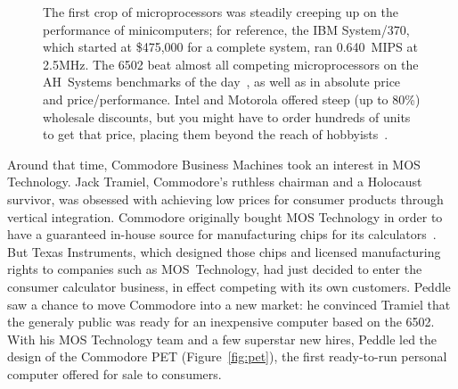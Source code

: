 \begin{figure}
  
  \caption{\label{fig:price_performance} 
    The first crop of microprocessors was steadily creeping up on the
    performance of minicomputers; for reference, the IBM System/370,
    which started at \$475,000 for a complete system, ran 0.640~MIPS at
    2.5MHz. 
    The 6502 beat almost all competing microprocessors on the AH~Systems benchmarks of
    the day~\cite{edn75:6502}, as well as in absolute price and price/performance.
    Intel and Motorola offered steep (up to 80\%) wholesale discounts,
    but you might have to order hundreds of units to
    get that price, placing them beyond the reach of hobbyists~\cite[p. 228]{ceruzzi}.}
\end{figure}




Around that time, Commodore Business Machines took an interest in MOS
Technology.
Jack Tramiel, Commodore's ruthless chairman and a Holocaust survivor,
was obsessed with achieving low prices for consumer products through
vertical integration.
Commodore originally bought MOS Technology in order to have a
guaranteed in-house source for manufacturing chips for its
calculators~\cite{commodore}.
But Texas Instruments, which designed those chips and licensed
manufacturing rights to companies such as MOS~Technology, had just
decided to enter the consumer calculator business, in effect competing
with its own customers.
Peddle saw a chance to move Commodore into a new market: he convinced
Tramiel that the generaly public was ready for an inexpensive computer based on
the 6502.
With his MOS Technology team and a few superstar new hires, Peddle led
the design of the Commodore PET (Figure~\ref{fig:pet}), the first
ready-to-run personal computer offered for sale to consumers.


